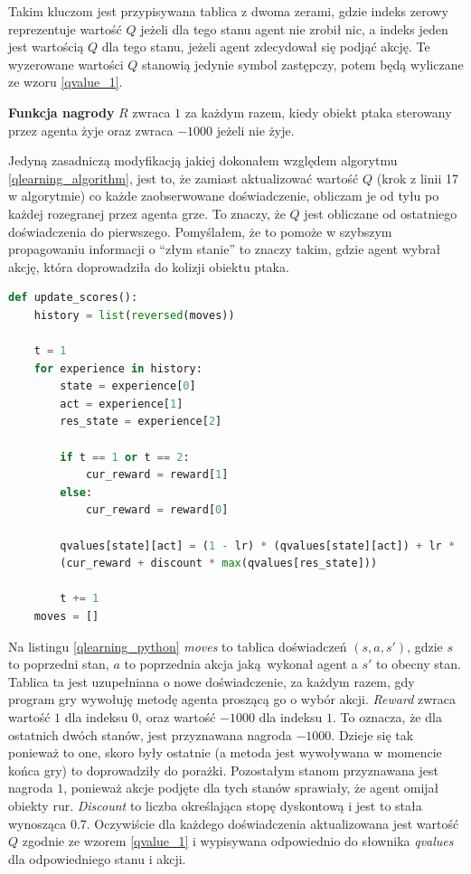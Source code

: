 \documentclass[a4paper, 12pt,oneside]{book}
\begin{document}
Takim kluczom jest przypisywana tablica z dwoma zerami, gdzie
indeks zerowy reprezentuje wartość $Q$ jeżeli dla tego stanu agent nie zrobił
nic, a indeks jeden jest wartością $Q$ dla tego stanu, jeżeli agent zdecydował
się podjąć akcję. Te wyzerowane wartości $Q$ stanowią jedynie symbol zastępczy,
potem będą wyliczane ze wzoru \ref{qvalue_1}.

\textbf{Funkcja nagrody} $R$ zwraca $1$ za każdym razem, kiedy obiekt
ptaka sterowany przez agenta żyje oraz zwraca $-1000$ jeżeli nie żyje.

Jedyną zasadniczą modyfikacją jakiej dokonałem względem algorytmu
\ref{qlearning_algorithm}, jest to, że zamiast aktualizować wartość $Q$ (krok z
linii 17 w algorytmie) co każde zaobserwowane doświadczenie, obliczam je od
tyłu po każdej rozegranej przez agenta grze. To znaczy, że $Q$ jest obliczane
od ostatniego doświadczenia do pierwszego. Pomyślałem, że to pomoże w szybszym
propagowaniu informacji o ``złym stanie'' to znaczy takim, gdzie agent wybrał
akcję, która doprowadziła do kolizji obiektu ptaka. 
\begin{lstlisting}[language=Python, label={qlearning_python},
caption={Zaimplementowany algorytm Q-Learning}, captionpos=t]
def update_scores():
    history = list(reversed(moves))

    t = 1
    for experience in history:
        state = experience[0]
        act = experience[1]
        res_state = experience[2]

        if t == 1 or t == 2:
            cur_reward = reward[1]
        else:
            cur_reward = reward[0]

        qvalues[state][act] = (1 - lr) * (qvalues[state][act]) + lr *
	    (cur_reward + discount * max(qvalues[res_state]))

        t += 1
    moves = []
\end{lstlisting}
Na listingu \ref{qlearning_python} \textit{moves} to tablica doświadczeń
$(s, a, s')$, gdzie $s$ to poprzedni
stan, $a$ to poprzednia akcja jaką wykonał agent a $s'$ to obecny stan. Tablica
ta jest uzupełniana o nowe doświadczenie, za każdym razem, gdy program gry 
wywołuję metodę agenta proszącą go o wybór akcji. \textit{Reward} zwraca
wartość $1$ dla indeksu $0$, oraz wartość $-1000$ dla indeksu $1$. To oznacza,
że dla ostatnich dwóch stanów, jest przyznawana nagroda $-1000$. Dzieje się tak
ponieważ to one, skoro były ostatnie (a metoda jest wywoływana w momencie końca
gry) to doprowadziły do porażki. Pozostałym stanom przyznawana jest nagroda
$1$, ponieważ akcje podjęte dla tych stanów sprawiały, że agent omijał obiekty
rur. \textit{Discount} to liczba określająca stopę dyskontową i jest to
stała wynosząca $0.7$. Oczywiście dla każdego doświadczenia aktualizowana jest
wartość $Q$ zgodnie ze wzorem \ref{qvalue_1} i wypisywana odpowiednio do
słownika \textit{qvalues} dla odpowiedniego stanu i akcji. 
\end{document}
